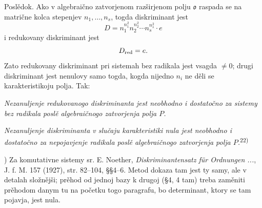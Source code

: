 \documentclass[11pt]{article}
\providecommand{\mo}{\mathfrak{o}}
\begin{document}
Poslědok. Ako v algebraično zatvorjenom razširjenom polju $\mo$ raspada se na matrične kolca stepenjev $n_1,\ldots,n_s$, togda diskriminant jest
\[
        D=n_1^{n_1^2}n_2^{n_2^2}\cdots n_s^{n_s^2}\cdot e
\]
i redukovany diskriminant jest
\[
        D_{\rm red}=e.
\]
Zato redukovany diskriminant pri sistemah bez radikala jest vsagda $\ne0$; drugi diskriminant jest nenulovy samo togda, kogda nijedno $n_i$ ne děli se karakteristikoju polja. Tak:

\emph{Nezanuljenje redukovanogo diskriminanta jest neobhodno i dostatočno za sistemy bez radikala poslě algebraičnogo zatvorjenja polja $P$.}

\emph{Nezanuljenje diskriminanta v slučaju karakteristiki nula jest neobhodno i dostatočno za nepojavjenje radikala poslě algebraičnogo zatvorjenja polja $P$.}\textsuperscript{22)}

{\footnotesize{}) Za komutativne sistemy sr. E. Noether, \emph{Diskriminantensatz für Ordnungen ...}, J. f. M. 157 (1927), str. 82--104, §§4--6. Metod dokaza tam jest ty samy, ale v detalah složnějši; prěhod od jednoj bazy k drugoj (§4, 4 tam) treba zaměniti prěhodom danym tu na početku togo paragrafu, bo determinant, ktory se tam pojavja, jest nula.\par}
\end{document}
